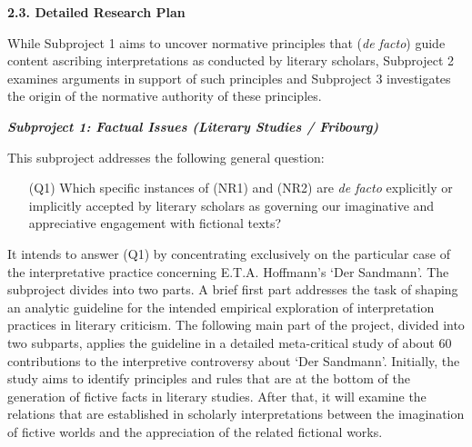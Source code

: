 \noindent\textbf{\large 2.3. Detailed Research Plan}

\noindent While Subproject 1 aims to uncover normative principles that (\emph{de facto}) guide content ascribing interpretations as conducted by literary scholars, Subproject 2 examines arguments in support of such principles and Subproject 3 investigates the origin of the normative authority of these principles.


\vspace{.2cm}
\noindent\textbf{\emph{Subproject 1: Factual Issues (Literary Studies / Fribourg)}}
\vspace{.1cm}

This subproject addresses the following general question:

\vspace{-.1cm}
\begin{itemize}[leftmargin=2cm]
\item[(Q1)] Which specific instances of (NR1) and (NR2) are \emph{de facto} explicitly or implicitly accepted by literary scholars as governing our imaginative and appreciative engagement with fictional texts?
\end{itemize}
\vspace{-.1cm}


\noindent It intends to answer (Q1) by concentrating exclusively on the particular case of the interpretative practice concerning E.T.A. Hoffmann's `Der Sandmann'. The subproject divides into two parts. A brief first part addresses the task of shaping an analytic guideline for the intended empirical exploration of interpretation practices in literary criticism. The following main part of the project, divided into two subparts, applies the guideline in a detailed meta-critical study of about 60 contributions to the interpretive controversy about `Der Sandmann'. Initially, the study aims to identify principles and rules that are at the bottom of the generation of fictive facts in literary studies. After that, it will examine the relations that are established in scholarly interpretations between the imagination of fictive worlds and the appreciation of the related fictional works.


